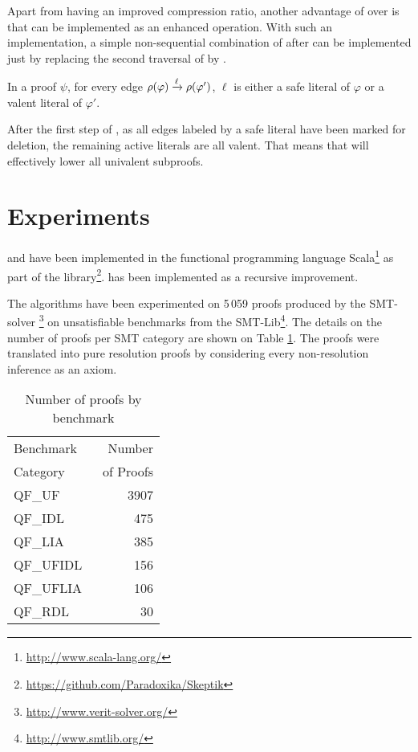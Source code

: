 \documentclass{llncs}
\begin{document}
Apart from having an improved compression ratio, another advantage of {\LowerUnivalents} over
{\LowerUnits} is that {\LowerUnivalents} can be implemented as an enhanced 
operation. With such an implementation, a simple non-sequential combination of {\LowerUnivalents}
after {\RPI} can be implemented just by replacing the second traversal of {\RPI} by
{\LowerUnivalents}.

\begin{proposition} \label{prop:LunivRPI}
In a proof $\psi$, for every edge $\rho(\varphi) \xrightarrow{\ell} \rho(\varphi')$, $\ell$ is either a safe literal
of $\varphi$ or a valent literal of $\varphi'$.
\end{proposition}

After the first step of {\RPI}, as all edges labeled by a safe literal have been marked for
deletion, the remaining active literals are all valent. That means that {\LowerUnivalents} will
effectively lower all univalent subproofs.



\section{Experiments} \label{sec:exp}

{\LowerUnivalents} and {\LUnivRPI} have been implemented in the functional programming
language Scala\footnote{\url{http://www.scala-lang.org/}} as part of the \skeptik
library\footnote{\url{https://github.com/Paradoxika/Skeptik}}. {\LowerUnivalents} has been implemented as a
recursive  improvement.

The algorithms have been experimented on 5\,059 proofs produced by the SMT-solver
{\veriT}\footnote{\url{http://www.verit-solver.org/}} on unsatisfiable benchmarks from the
SMT-Lib\footnote{\url{http://www.smtlib.org/}}.  The details on the number of proofs per SMT category
are shown on Table \ref{tab:benchmarks}.  The proofs were translated into pure resolution proofs by
considering every non-resolution inference as an axiom.

\begin{table}[tb]
  \caption{Number of proofs by benchmark}
  \label{tab:benchmarks}
  \centering
  \begin{tabular}{lr}
    \toprule
    Benchmark~ &  Number \\
    Category       & ~of Proofs \\
    \midrule
    QF\_UF      & 3907 \\
    QF\_IDL     &  475 \\
    QF\_LIA     &  385 \\
    QF\_UFIDL   &  156 \\
    QF\_UFLIA   &  106 \\
    QF\_RDL     &   30 \\
    \bottomrule
  \end{tabular}
\end{table}
\end{document}
